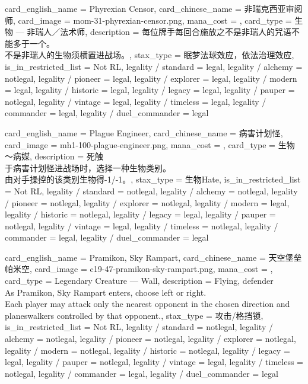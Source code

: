 \documentclass[lang = cn, color = black, 10pt]{AllThatStax}
\begin{document}
\card
{
	card_english_name = {Phyrexian Censor},
	card_chinese_name = {非瑞克西亚审阅师},
	card_image = mom-31-phyrexian-censor.png,
	mana_cost = ,
	card_type = 生物 — 非瑞人／法术师,
	description = {每位牌手每回合施放之不是非瑞人的咒语不能多于一个。\\
		不是非瑞人的生物须横置进战场。},
	stax_type = 眠梦法球效应，依法治理效应,
	is_in_restricted_list = Not RL,
	legality / standard = legal,
	legality / alchemy = notlegal,
	legality / pioneer = legal,
	legality / explorer = legal,
	legality / modern = legal,
	legality / historic = legal,
	legality / legacy = legal,
	legality / pauper = notlegal,
	legality / vintage = legal,
	legality / timeless = legal,
	legality / commander = legal,
	legality / duel_commander = legal
}

\card
{
	card_english_name = {Plague Engineer},
	card_chinese_name = {病害计划怪},
	card_image = mh1-100-plague-engineer.png,
	mana_cost = ,
	card_type = 生物 ～病媒,
	description = {死触\\
		于病害计划怪进战场时，选择一种生物类别。\\
		由对手操控的该类别生物得-1/-1。},
	stax_type = 生物Hate,
	is_in_restricted_list = Not RL,
	legality / standard = notlegal,
	legality / alchemy = notlegal,
	legality / pioneer = notlegal,
	legality / explorer = notlegal,
	legality / modern = legal,
	legality / historic = notlegal,
	legality / legacy = legal,
	legality / pauper = notlegal,
	legality / vintage = legal,
	legality / timeless = notlegal,
	legality / commander = legal,
	legality / duel_commander = legal
}

\card
{
	card_english_name = {Pramikon, Sky Rampart},
	card_chinese_name = {天空堡垒帕米空},
	card_image = c19-47-pramikon-sky-rampart.png,
	mana_cost = ,
	card_type = Legendary Creature — Wall,
	description = {Flying, defender\\
		As Pramikon, Sky Rampart enters, choose left or right.\\
		Each player may attack only the nearest opponent in the chosen direction and planeswalkers controlled by that opponent.},
	stax_type = 攻击/格挡锁,
	is_in_restricted_list = Not RL,
	legality / standard = notlegal,
	legality / alchemy = notlegal,
	legality / pioneer = notlegal,
	legality / explorer = notlegal,
	legality / modern = notlegal,
	legality / historic = notlegal,
	legality / legacy = legal,
	legality / pauper = notlegal,
	legality / vintage = legal,
	legality / timeless = notlegal,
	legality / commander = legal,
	legality / duel_commander = legal
}
\end{document}
